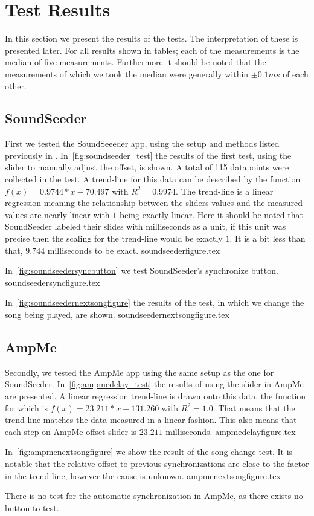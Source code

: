 \section{Test Results}
In this section we present the results of the tests.
The interpretation of these is presented later.
For all results shown in tables; each of the measurements is the median of five measurements.
Furthermore it should be noted that the measurements of which we took the median were generally within $\pm 0.1 ms$ of each other.

\subsection{SoundSeeder}
First we tested the SoundSeeeder app, using the setup and methods listed previously in .
In~\vref{fig:soundseeder_test} the results of the first test, using the slider to manually adjust the offset, is shown.
A total of 115 datapoints were collected in the test.
A trend-line for this data can be described by the function $f(x) = 0.9744 * x - 70.497$ with $R^2=0.9974$.
The trend-line is a linear regression meaning the relationship between the sliders values and the measured values are nearly linear with $1$ being exactly linear.
Here it should be noted that SoundSeeder labeled their slides with milliseconds as a unit, if this unit was precise then the scaling for the trend-line would be exactly $1$.
It is a bit less than that, $9.744$ milliseconds to be exact.
{soundseederfigure.tex}

In~\vref{fig:soundseedersyncbutton} we test SoundSeeder's synchronize button.
{soundseedersyncfigure.tex}

In~\vref{fig:soundseedernextsongfigure} the results of the test, in which we change the song being played, are shown.
{soundseedernextsongfigure.tex}

\subsection{AmpMe}
Secondly, we tested the AmpMe app using the same setup as the one for SoundSeeder.
In~\vref{fig:ampmedelay_test} the results of using the slider in AmpMe are presented.
A linear regression trend-line is drawn onto this data, the function for which is $f(x) = 23.211 * x + 131.260$ with $R^2 = 1.0$.
That means that the trend-line matches the data measured in a linear fashion.
This also means that each step on AmpMe offset slider is $23.211$ milliseconds.
{ampmedelayfigure.tex}

In~\vref{fig:ampmenextsongfigure} we show the result of the song change test.
It is notable that the relative offset to previous synchronizations are close to the factor in the trend-line, however the cause is unknown.
{ampmenextsongfigure.tex}

There is no test for the automatic synchronization in AmpMe, as there exists no button to test.

